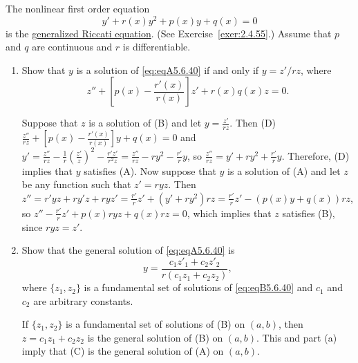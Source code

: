 \documentclass{ximera}
\begin{document}
\begin{problem}\label{exer:5.6.40}
The nonlinear first order equation
\begin{equation}\label{eq:eqA5.6.40}
 y'+r(x)y^2+p(x)y+q(x)=0
\end{equation}
is the
\href{http://http://www-history.mcs.st-and.ac.uk/Indexes/Riccati.html}
{generalized Riccati equation}.
(See Exercise~\ref{exer:2.4.55}.)
Assume that $p$ and $q$ are continuous and $r$ is differentiable.

\begin{enumerate}
\item %
Show that $y$ is a solution of \ref{eq:eqA5.6.40} if and only if
 $y={z'/rz}$,  where \begin{equation}\label{eq:eqB5.6.40}
z''+\left[p(x)-\frac{r'(x)}{r(x)}\right]
z'+r(x)q(x)z=0.
\end{equation}

\begin{solution}
    Suppose that $z$ is a solution of (B)
and let $y=\frac{z'}{ rz}$. Then
(D) $\frac{z''}{ rz}+\left[p(x)-\frac{r'(x)}{ r(x)}\right]
y+q(x)=0$
and  $y'=\frac{z''}{ rz}-\frac{1}{ r}\left(\frac{z'}{
z}\right)^2-\frac{r'z'}{ r^2z}=\frac{z''}{
rz}-ry^2-\frac{r'}{ r}y$, so
$\frac{z''}{ rz}=y'+ry^2+\frac{r'}{ r}y$. Therefore,
(D) implies that
$y$
satisfies (A). Now suppose that $y$ is a solution of (A) and let $z$
be any function such that $z'=ryz$. Then $z''=r'yz+ry'z+ryz'=
\frac{r'}{ r}z'+
(y'+ry^2)rz
=\frac{r'}{ r}z'-(p(x)y+q(x))rz$, so
$z''-\frac{r'}{ r}z'+p(x)ryz+q(x)rz=0$,
which implies that $z$ satisfies (B), since $ryz=z'$.
\end{solution}

\item %
 Show that the general solution of \ref{eq:eqA5.6.40} is
$$
 y=\frac{c_1z'_1+c_2z'_2}{r(c_1z_1+c_2z_2)},
$$
where $\{z_1,z_2\}$ is a fundamental set of solutions of
\ref{eq:eqB5.6.40} and $c_1$ and $c_2$ are arbitrary constants.

\begin{solution}
    If $\{z_1,z_2\}$ is a fundamental set of solutions of
(B) on  $(a,b)$, then $z=c_1z_1+c_2z_2$ is the general solution of
(B) on $(a,b)$. This and part (a) imply that (C) is the general
solution of (A) on $(a,b)$.
\end{solution}
\end{enumerate}
\end{problem}
\end{document}

